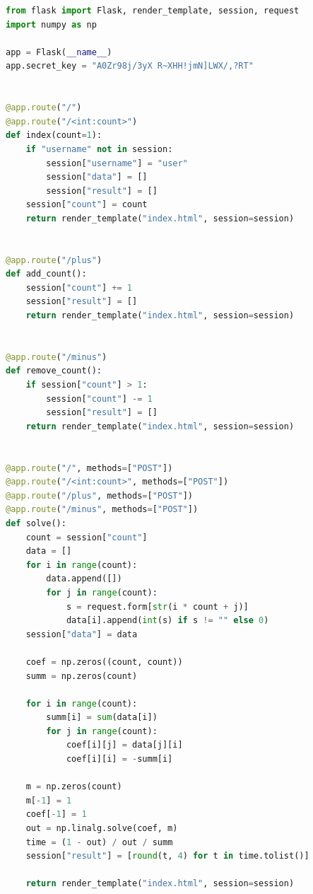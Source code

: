 \documentclass[a4paper, 12pt]{article}
\begin{document}
\lstset{style=mystyle}

\begin{lstlisting}[language=Python, caption = Программная реализация определения времени пребывания сложной системы в каждом из состояний]
from flask import Flask, render_template, session, request
import numpy as np

app = Flask(__name__)
app.secret_key = "A0Zr98j/3yX R~XHH!jmN]LWX/,?RT"


@app.route("/")
@app.route("/<int:count>")
def index(count=1):
	if "username" not in session:
		session["username"] = "user"
		session["data"] = []
		session["result"] = []
	session["count"] = count
	return render_template("index.html", session=session)


@app.route("/plus")
def add_count():
	session["count"] += 1
	session["result"] = []
	return render_template("index.html", session=session)


@app.route("/minus")
def remove_count():
	if session["count"] > 1:
		session["count"] -= 1
		session["result"] = []
	return render_template("index.html", session=session)


@app.route("/", methods=["POST"])
@app.route("/<int:count>", methods=["POST"])
@app.route("/plus", methods=["POST"])
@app.route("/minus", methods=["POST"])
def solve():
	count = session["count"]
	data = []
	for i in range(count):
		data.append([])
		for j in range(count):
			s = request.form[str(i * count + j)]
			data[i].append(int(s) if s != "" else 0)
	session["data"] = data

	coef = np.zeros((count, count))
	summ = np.zeros(count)

	for i in range(count):
		summ[i] = sum(data[i])
		for j in range(count):
			coef[i][j] = data[j][i]
			coef[i][i] = -summ[i]

	m = np.zeros(count)
	m[-1] = 1
	coef[-1] = 1
	out = np.linalg.solve(coef, m)
	time = (1 - out) / out / summ
	session["result"] = [round(t, 4) for t in time.tolist()]

	return render_template("index.html", session=session)
\end{lstlisting}
\end{document}
